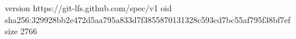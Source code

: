 version https://git-lfs.github.com/spec/v1
oid sha256:329928bb2e472d5aa795a833d7f3855870131328c593cd7bc55af795f38bf7ef
size 2766
